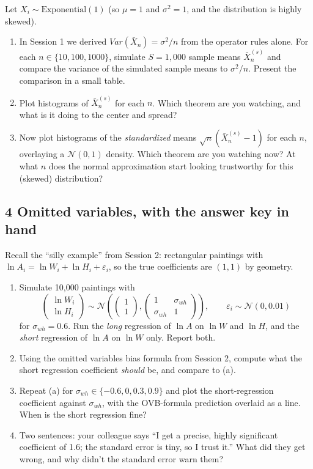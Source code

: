 \documentclass[11pt]{article}
\begin{document}
Let $X_{i} \sim \text{Exponential}(1)$ (so $\mu = 1$ and $\sigma^{2} = 1$, and the
distribution is highly skewed).
\begin{enumerate}[label=(\alph*)]
\item In Session 1 we derived $Var\left(\bar{X}_{n}\right) = \sigma^{2}/n$ from the
operator rules alone. For each $n \in \{10, 100, 1000\}$, simulate $S = 1{,}000$ sample
means $\bar{X}_{n}^{(s)}$ and compare the variance of the simulated sample means to
$\sigma^{2}/n$. Present the comparison in a small table.
\item Plot histograms of $\bar{X}_{n}^{(s)}$ for each $n$. Which theorem are you watching,
and what is it doing to the center and spread?
\item Now plot histograms of the \emph{standardized} means
$\sqrt{n}\left(\bar{X}_{n}^{(s)} - 1\right)$ for each $n$, overlaying a
$\mathcal{N}\left(0, 1\right)$ density. Which theorem are you watching now? At what $n$
does the normal approximation start looking trustworthy for this (skewed) distribution?
\end{enumerate}

\subsection*{4 Omitted variables, with the answer key in hand}

Recall the ``silly example'' from Session 2: rectangular paintings with
$\ln A_{i} = \ln W_{i} + \ln H_{i} + \varepsilon_{i}$, so the true coefficients are
$\left(1, 1\right)$ by geometry.
\begin{enumerate}[label=(\alph*)]
\item Simulate 10,000 paintings with
\[
\left(\begin{array}{c} \ln W_{i} \\ \ln H_{i} \end{array}\right) \sim
\mathcal{N}\left(\left(\begin{array}{c} 1 \\ 1 \end{array}\right),
\left(\begin{array}{cc} 1 & \sigma_{wh} \\ \sigma_{wh} & 1 \end{array}\right)\right),
\qquad \varepsilon_{i} \sim \mathcal{N}\left(0, 0.01\right)
\]
for $\sigma_{wh} = 0.6$. Run the \emph{long} regression of $\ln A$ on $\ln W$ and
$\ln H$, and the \emph{short} regression of $\ln A$ on $\ln W$ only. Report both.
\item Using the omitted variables bias formula from Session 2, compute what the short
regression coefficient \emph{should} be, and compare to (a).
\item Repeat (a) for $\sigma_{wh} \in \{-0.6, 0, 0.3, 0.9\}$ and plot the short-regression
coefficient against $\sigma_{wh}$, with the OVB-formula prediction overlaid as a line.
When is the short regression fine?
\item Two sentences: your colleague says ``I get a precise, highly significant
coefficient of 1.6; the standard error is tiny, so I trust it.'' What did they get
wrong, and why didn't the standard error warn them?
\end{enumerate}
\end{document}
